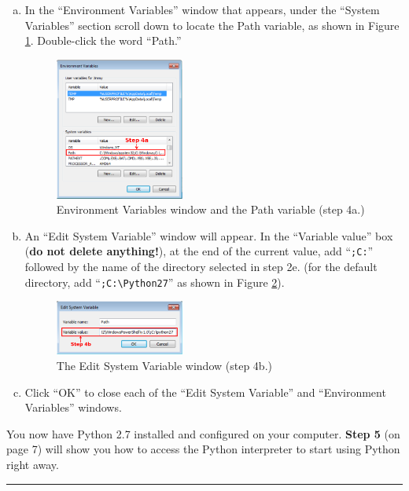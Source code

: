 \documentclass[11pt,english]{article}
\newcommand{\myhrule}{\vspace{0.3cm}\hrule\vspace{0.3cm}}
\begin{document}
\begin{enumerate}[a.]
\item In the ``Environment Variables'' window that appears, under the ``System
Variables'' section scroll down to locate the Path variable, as shown in Figure
\ref{fig:dia7}. Double-click the word ``Path.''
\begin{figure}[h]
\begin{center}
\includegraphics[width=0.4\textwidth]{dia7}
\end{center}
\vspace{-0.5cm}
\caption{Environment Variables window and the Path variable (step 4a.)}
\label{fig:dia7}
\end{figure}
\item An ``Edit System Variable'' window will appear. In the ``Variable value''
box ({\bf do not delete anything!}), at the end of the current value, add
``\texttt{;C:}'' followed by the name of the directory selected in step 2e.
(for the default directory, add ``\texttt{;C:\textbackslash Python27}'' as
shown in Figure \ref{fig:dia8}).
\begin{figure}[h]
\begin{center}
\includegraphics[width=0.4\textwidth]{dia8}
\end{center}
\vspace{-0.5cm}
\caption{The Edit System Variable window (step 4b.)}
\label{fig:dia8}
\end{figure}
\item Click ``OK'' to close each of the ``Edit System Variable'' and
``Environment Variables'' windows.
\end{enumerate}
\vfill
You now have Python 2.7 installed and configured on your computer. {\bf Step 5}
(on page 7) will show you how to access the Python interpreter to start using
Python right away.
\myhrule
\end{document}
